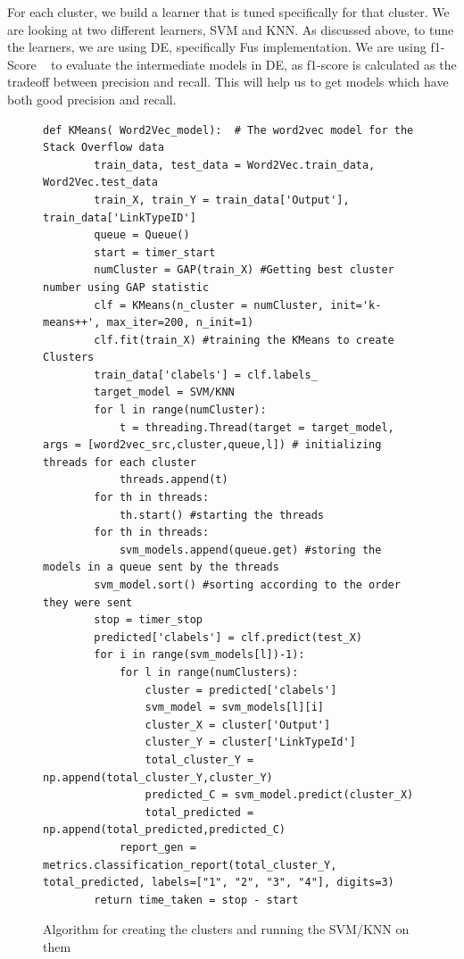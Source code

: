 \documentclass[sigconf]{acmart}
\theoremstyle{break}
\begin{document}
    For each cluster, we build a learner that is tuned specifically for that cluster. We are looking at two different learners, SVM and KNN. As discussed above, to tune the learners, we are using DE, specifically Fu\textquotesingle s implementation. We are using f1-Score ~\cite{sokolova2006beyond} to evaluate the intermediate models in DE, as f1-score is calculated as the tradeoff between precision and recall. This will help us to get models which have both good precision and recall.
    
    \begin{figure}[!t]
    \small 
    \begin{lstlisting}[mathescape,linewidth=6.7cm,frame=none,numbers=right ]
      def KMeans( Word2Vec_model):  # The word2vec model for the Stack Overflow data
        train_data, test_data = Word2Vec.train_data, Word2Vec.test_data
        train_X, train_Y = train_data['Output'], train_data['LinkTypeID']
        queue = Queue()
        start = timer_start
        numCluster = GAP(train_X) #Getting best cluster number using GAP statistic
        clf = KMeans(n_cluster = numCluster, init='k-means++', max_iter=200, n_init=1)
        clf.fit(train_X) #training the KMeans to create Clusters
        train_data['clabels'] = clf.labels_
        target_model = SVM/KNN
        for l in range(numCluster):
            t = threading.Thread(target = target_model, args = [word2vec_src,cluster,queue,l]) # initializing threads for each cluster
            threads.append(t)
        for th in threads:
            th.start() #starting the threads
        for th in threads:
            svm_models.append(queue.get) #storing the models in a queue sent by the threads
        svm_model.sort() #sorting according to the order they were sent
        stop = timer_stop
        predicted['clabels'] = clf.predict(test_X)
        for i in range(svm_models[l])-1):
            for l in range(numClusters):
                cluster = predicted['clabels'] 
                svm_model = svm_models[l][i]
                cluster_X = cluster['Output']
                cluster_Y = cluster['LinkTypeId']
                total_cluster_Y = np.append(total_cluster_Y,cluster_Y)
                predicted_C = svm_model.predict(cluster_X)
                total_predicted = np.append(total_predicted,predicted_C)
            report_gen = metrics.classification_report(total_cluster_Y, total_predicted, labels=["1", "2", "3", "4"], digits=3)
        return time_taken = stop - start   
    \end{lstlisting} 
    \caption{Algorithm for creating the clusters and running the SVM/KNN on them}
    \label{fig:pseudo_KMeans} 
    \vspace{-0.3cm}
    \end{figure}
    
\end{document}
